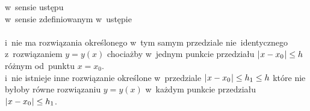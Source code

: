 \documentclass[a4paper,11pt]{article}
\numberwithin{equation}{section}
\begin{document}
\noindent
{}
\Jest w~sensie ustępu \\
\PowinnoByc w~sensie zdefiniowanym w~ustępie \\
 \\
\Jest i~nie ma rozwiązania określonego w~tym samym przedziale
nie~identycznego z~rozwiązaniem $y = y( x )$ chociażby w~jednym
punkcie przedziału $| \hspace{0.05em}  x - x_{ 0 }  \hspace{0.05em} | \leq h$ różnym
od~punktu $x = x_{ 0 }$. \\
\PowinnoByc i~nie istnieje inne rozwiązanie określone w~przedziale
$| \hspace{0.05em}  x - x_{ 0 }  \hspace{0.05em} | \leq h_{ 1 } \leq h$ które nie byłoby równe
rozwiązaniu $y = y( x )$ w~każdym punkcie przedziału
$| \hspace{0.05em}  x - x_{ 0 }  \hspace{0.05em} | \leq h_{ 1 }$. \\

\VerSpaceTwo











\printbibliography





\end{document}
